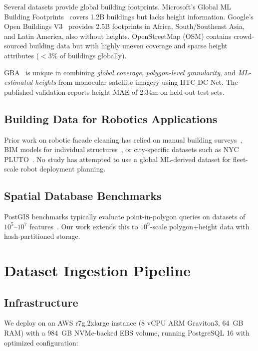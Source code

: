 \documentclass[10pt,twocolumn]{article}
\begin{document}
Several datasets provide global building footprints. Microsoft's Global ML Building Footprints~\citep{microsoft2023buildings} covers 1.2B buildings but lacks height information. Google's Open Buildings V3~\citep{sirko2023google} provides 2.5B footprints in Africa, South/Southeast Asia, and Latin America, also without heights. OpenStreetMap (OSM) contains crowd-sourced building data but with highly uneven coverage and sparse height attributes ($<$3\% of buildings globally).

GBA~\citep{zhu2025gba} is unique in combining \emph{global coverage}, \emph{polygon-level granularity}, and \emph{ML-estimated heights} from monocular satellite imagery using HTC-DC Net. The published validation reports height MAE of 2.34m on held-out test sets.

\subsection{Building Data for Robotics Applications}

Prior work on robotic facade cleaning has relied on manual building surveys~\citep{ott2020facade}, BIM models for individual structures~\citep{wang2021bim}, or city-specific datasets such as NYC PLUTO~\citep{nyc2023pluto}. No study has attempted to use a global ML-derived dataset for fleet-scale robot deployment planning.

\subsection{Spatial Database Benchmarks}

PostGIS benchmarks typically evaluate point-in-polygon queries on datasets of $10^5$--$10^7$ features~\citep{postgis2024}. Our work extends this to $10^9$-scale polygon+height data with hash-partitioned storage.

\section{Dataset Ingestion Pipeline}
\label{sec:ingestion}

\subsection{Infrastructure}

We deploy on an AWS r7g.2xlarge instance (8 vCPU ARM Graviton3, 64~GB RAM) with a 984~GB NVMe-backed EBS volume, running PostgreSQL 16 with optimized configuration:
\end{document}
